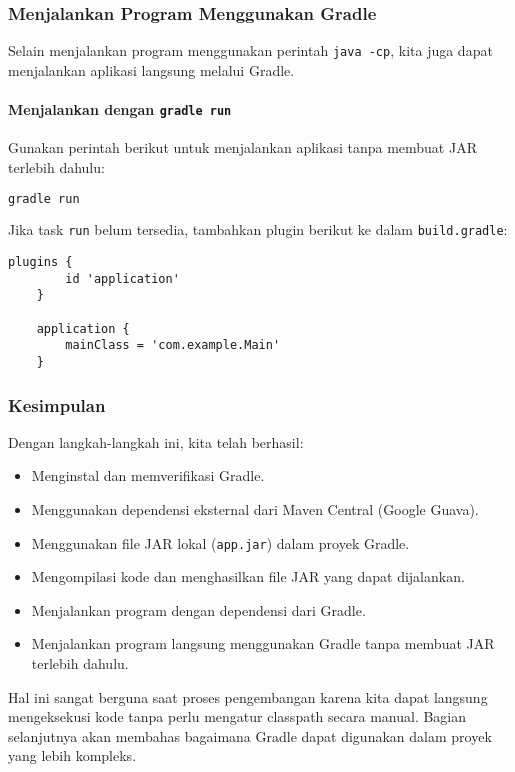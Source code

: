 \subsubsection{Menjalankan Program Menggunakan Gradle}
Selain menjalankan program menggunakan perintah \texttt{java -cp}, kita juga dapat menjalankan aplikasi langsung melalui Gradle.

\paragraph{Menjalankan dengan \texttt{gradle run}}
Gunakan perintah berikut untuk menjalankan aplikasi tanpa membuat JAR terlebih dahulu:

\begin{lstlisting}[language=bash]
	gradle run
\end{lstlisting}

Jika task \texttt{run} belum tersedia, tambahkan plugin berikut ke dalam \texttt{build.gradle}:

\begin{lstlisting}[style=XmlStyle]
	plugins {
		id 'application'
	}
	
	application {
		mainClass = 'com.example.Main'
	}
\end{lstlisting}

\subsubsection{Kesimpulan}
Dengan langkah-langkah ini, kita telah berhasil:
\begin{itemize}
	\item Menginstal dan memverifikasi Gradle.
	\item Menggunakan dependensi eksternal dari Maven Central (Google Guava).
	\item Menggunakan file JAR lokal (\texttt{app.jar}) dalam proyek Gradle.
	\item Mengompilasi kode dan menghasilkan file JAR yang dapat dijalankan.
	\item Menjalankan program dengan dependensi dari Gradle.
	\item Menjalankan program langsung menggunakan Gradle tanpa membuat JAR terlebih dahulu.
\end{itemize}

Hal ini sangat berguna saat proses pengembangan karena kita dapat langsung mengeksekusi kode tanpa perlu mengatur classpath secara manual. Bagian selanjutnya akan membahas bagaimana Gradle dapat digunakan dalam proyek yang lebih kompleks.


